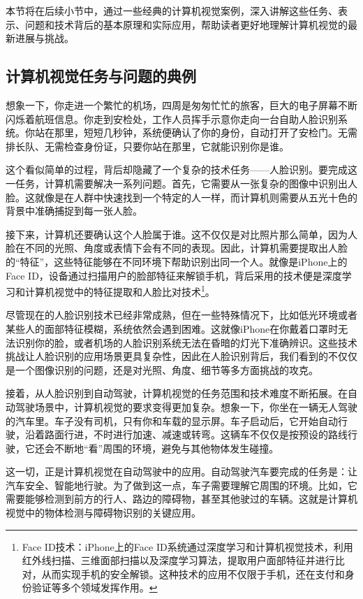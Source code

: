 本节将在后续小节中，通过一些经典的计算机视觉案例，深入讲解这些任务、表示、问题和技术背后的基本原理和实际应用，帮助读者更好地理解计算机视觉的最新进展与挑战。


\subsection{计算机视觉任务与问题的典例}

想象一下，你走进一个繁忙的机场，四周是匆匆忙忙的旅客，巨大的电子屏幕不断闪烁着航班信息。你走到安检处，工作人员挥手示意你走向一台自助人脸识别系统。你站在那里，短短几秒钟，系统便确认了你的身份，自动打开了安检门。无需排长队、无需检查身份证，只要你站在那里，它就能识别你是谁。

这个看似简单的过程，背后却隐藏了一个复杂的技术任务——人脸识别。要完成这一任务，计算机需要解决一系列问题。首先，它需要从一张复杂的图像中识别出人脸。这就像是在人群中快速找到一个特定的人一样，而计算机则需要从五光十色的背景中准确捕捉到每一张人脸。

接下来，计算机还要确认这个人脸属于谁。这不仅仅是对比照片那么简单，因为人脸在不同的光照、角度或表情下会有不同的表现。因此，计算机需要提取出人脸的“特征”，这些特征能够在不同环境下帮助识别出同一个人。就像是iPhone上的Face ID，设备通过扫描用户的脸部特征来解锁手机，背后采用的技术便是深度学习和计算机视觉中的特征提取和人脸比对技术\footnote{Face ID技术：iPhone上的Face ID系统通过深度学习和计算机视觉技术，利用红外线扫描、三维面部扫描以及深度学习算法，提取用户面部特征并进行比对，从而实现手机的安全解锁。这种技术的应用不仅限于手机，还在支付和身份验证等多个领域发挥作用。}。

尽管现在的人脸识别技术已经非常成熟，但在一些特殊情况下，比如低光环境或者某些人的面部特征模糊，系统依然会遇到困难。这就像iPhone在你戴着口罩时无法识别你的脸，或者机场的人脸识别系统无法在昏暗的灯光下准确辨识。这些技术挑战让人脸识别的应用场景更具复杂性，因此在人脸识别背后，我们看到的不仅仅是一个图像识别的问题，还是对光照、角度、细节等多方面挑战的攻克。

接着，从人脸识别到自动驾驶，计算机视觉的任务范围和技术难度不断拓展。在自动驾驶场景中，计算机视觉的要求变得更加复杂。想象一下，你坐在一辆无人驾驶的汽车里。车子没有司机，只有你和车载的显示屏。车子启动后，它开始自动行驶，沿着路面行进，不时进行加速、减速或转弯。这辆车不仅仅是按预设的路线行驶，它还会不断地“看”周围的环境，避免与其他物体发生碰撞。

这一切，正是计算机视觉在自动驾驶中的应用。自动驾驶汽车要完成的任务是：让汽车安全、智能地行驶。为了做到这一点，车子需要理解它周围的环境。比如，它需要能够检测到前方的行人、路边的障碍物，甚至其他驶过的车辆。这就是计算机视觉中的物体检测与障碍物识别的关键应用。

